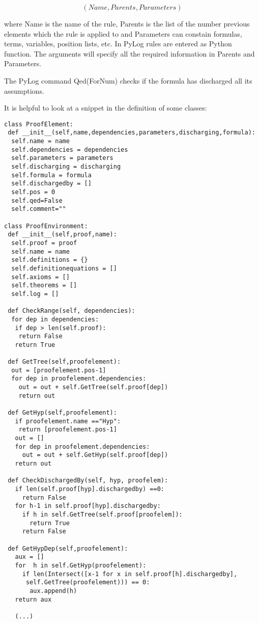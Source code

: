 \documentclass[12pt,leqno]{article}
\numberwithin{equation}{section}
\begin{document}
\[ (Name, Parents, Parameters) \]

where Name is the name of the rule, Parents is the list of the number previous elements which the rule is applied to and Parameters can constain formulas, terms, variables, position lists, etc.
In PyLog rules are entered as  Python function. The arguments will specify all the required information in Parents and Parameters.

The PyLog command Qed(ForNum) checks if the formula has discharged all its assumptions.

It is helpful to look at a snippet in the definition of some classes:

\begin{verbatim}
class ProofElement:
 def __init__(self,name,dependencies,parameters,discharging,formula):
  self.name = name
  self.dependencies = dependencies
  self.parameters = parameters
  self.discharging = discharging
  self.formula = formula
  self.dischargedby = []
  self.pos = 0
  self.qed=False 
  self.comment=""

class ProofEnvironment:
 def __init__(self,proof,name):
  self.proof = proof
  self.name = name
  self.definitions = {}
  self.definitionequations = []
  self.axioms = []
  self.theorems = []
  self.log = []

 def CheckRange(self, dependencies):
  for dep in dependencies:
   if dep > len(self.proof):
    return False
   return True

 def GetTree(self,proofelement):
  out = [proofelement.pos-1]
  for dep in proofelement.dependencies:
    out = out + self.GetTree(self.proof[dep])
    return out

 def GetHyp(self,proofelement):
   if proofelement.name =="Hyp":
    return [proofelement.pos-1]
   out = []
   for dep in proofelement.dependencies:
     out = out + self.GetHyp(self.proof[dep])
   return out

 def CheckDischargedBy(self, hyp, proofelem):
   if len(self.proof[hyp].dischargedby) ==0:
     return False
   for h-1 in self.proof[hyp].dischargedby:
     if h in self.GetTree(self.proof[proofelem]):
       return True
     return False

 def GetHypDep(self,proofelement): 
   aux = []
   for  h in self.GetHyp(proofelement):
     if len(Intersect([x-1 for x in self.proof[h].dischargedby],
      self.GetTree(proofelement))) == 0:
       aux.append(h)
   return aux 

   (...)
\end{verbatim}	
\end{document}

